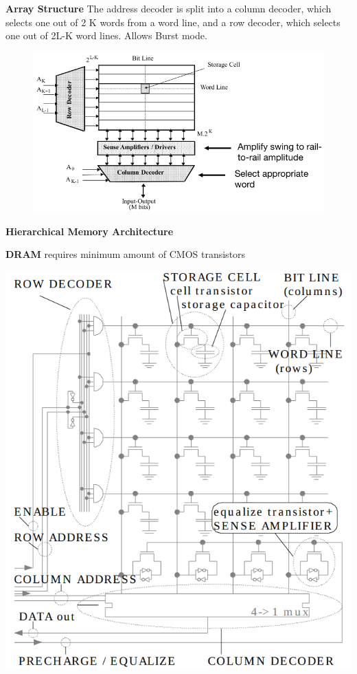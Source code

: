 \documentclass[english]{latex4ei/latex4ei_sheet}
\begin{document}
\textbf{Array Structure} The address decoder is split into a column decoder, which selects one out of 2 K words from a word line, and a row decoder, which selects one out of 2L-K word lines. Allows Burst mode.
\begin{figure}
	\centering
	\includegraphics[width=1\linewidth]{images//5.Memory/ArrayStructure.png}
\end{figure}

\textbf{Hierarchical Memory Architecture}

\textbf{DRAM} requires minimum amount of CMOS transistors


\begin{center}
  \centering
  \includegraphics[width=0.8\linewidth]{assets/DRAM.png}
  \label{fig:dram}
\end{center}
\end{document}
